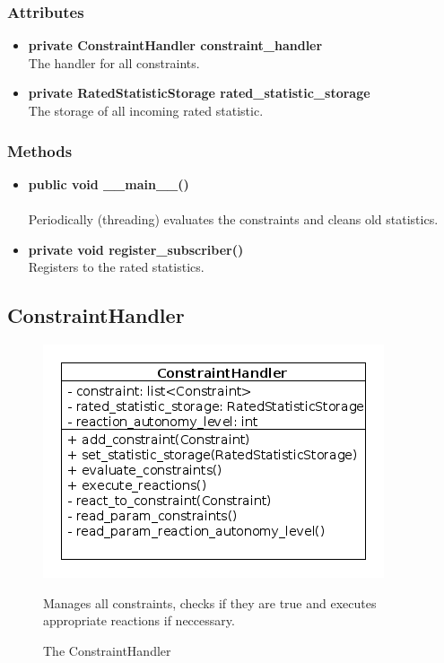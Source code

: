 \subsubsection{Attributes}
\begin{itemize}
	\item \textbf{ private ConstraintHandler constraint\_handler}\\
		The handler for all constraints.
	\item \textbf{ private RatedStatisticStorage rated\_statistic\_storage}\\
		The storage of all incoming rated statistic.
\end{itemize}
\subsubsection{Methods}
\begin{itemize}
	\item \textbf{ public void \_\_main\_\_() }\\\\
		Periodically (threading) evaluates the constraints and cleans old statistics.
	\item \textbf{ private void register\_subscriber() }\\
		Registers to the rated statistics.
\end{itemize}


\newpage
\subsection{ConstraintHandler}
\begin{figure}[htbp]
	\begin{minipage}[t]{8cm}
		\vspace{0pt}
		\centering
		\includegraphics[scale=0.6]{./diagram_pictures/reactor/ConstraintHandler.png}
		\caption{The ConstraintHandler}
	\end{minipage}
	\hfill
	\begin{minipage}[t]{8cm}
		\vspace{10pt}
			Manages all constraints, checks if they are true and executes appropriate reactions if neccessary.
	\end{minipage}
\end{figure}  


